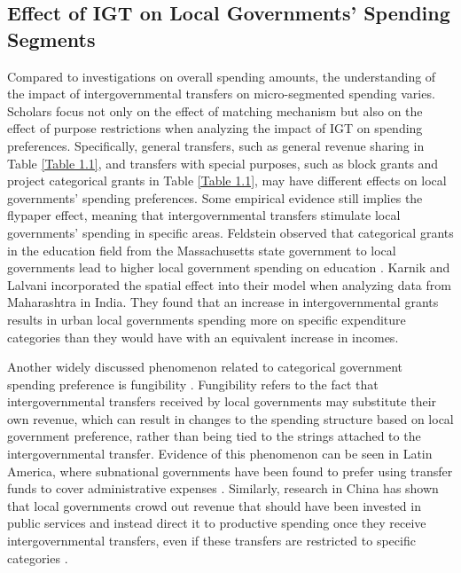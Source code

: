 \subsection{Effect of IGT on Local Governments' Spending Segments}

Compared to investigations on overall spending amounts, the understanding of the impact of intergovernmental transfers on micro-segmented spending varies. Scholars focus not only on the effect of matching mechanism but also on the effect of purpose restrictions when analyzing the impact of IGT on spending preferences. Specifically, general transfers, such as general revenue sharing in Table \ref{Table 1.1}, and transfers with special purposes, such as block grants and project categorical grants in Table \ref{Table 1.1}, may have different effects on local governments' spending preferences. Some empirical evidence still implies the flypaper effect, meaning that intergovernmental transfers stimulate local governments' spending in specific areas. Feldstein observed that categorical grants in the education field from the Massachusetts state government to local governments lead to higher local government spending on education \cite{feldstein1975wealth}. Karnik and Lalvani \cite{karnik2008flypaper} incorporated the spatial effect into their model when analyzing data from Maharashtra in India. They found that an increase in intergovernmental grants results in urban local governments spending more on specific expenditure categories than they would have with an equivalent increase in incomes.

Another widely discussed phenomenon related to categorical government spending preference is fungibility \cite{pack1993foreign}. Fungibility refers to the fact that intergovernmental transfers received by local governments may substitute their own revenue, which can result in changes to the spending structure based on local government preference, rather than being tied to the strings attached to the intergovernmental transfer. Evidence of this phenomenon can be seen in Latin America, where subnational governments have been found to prefer using transfer funds to cover administrative expenses \cite{stein1999fiscal}. Similarly, research in China has shown that local governments crowd out revenue that should have been invested in public services and instead direct it to productive spending once they receive intergovernmental transfers, even if these transfers are restricted to specific categories \cite{yinheng2011,fuyong2010}.

